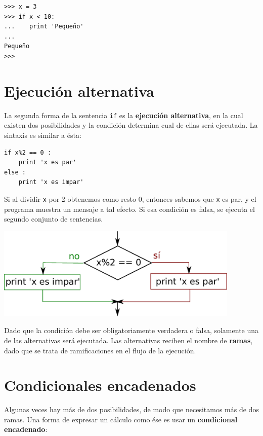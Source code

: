 \beforeverb
\begin{verbatim}
>>> x = 3
>>> if x < 10:
...    print 'Pequeño'
... 
Pequeño
>>>
\end{verbatim}
\afterverb
%

\section{Ejecución alternativa}
\label{alternative execution}


La segunda forma de la sentencia {\tt if} es la {\bf ejecución alternativa},
en la cual existen dos posibilidades y la condición determina
cual de ellas será ejecutada. La sintaxis es similar a ésta:

\beforeverb
\begin{verbatim}
if x%2 == 0 :
    print 'x es par'
else :
    print 'x es impar'
\end{verbatim}
\afterverb
%
Si al dividir {\tt x} por 2 obtenemos como resto 0, entonces sabemos
que {\tt x} es par, y el programa muestra un mensaje a tal
efecto. Si esa condición es falsa, se ejecuta el segundo
conjunto de sentencias.

\beforefig
\centerline{\includegraphics[height=1.75in]{figs2/if-else.eps}}
\afterfig

Dado que la condición debe ser obligatoriamente verdadera o falsa, solamente una de
las alternativas será ejecutada. Las alternativas reciben el nombre de
{\bf ramas}, dado que se trata de ramificaciones en el flujo de la ejecución.


\section{Condicionales encadenados}

Algunas veces hay más de dos posibilidades, de modo que necesitamos más
de dos ramas. Una forma de expresar un cálculo como ése es usar un
{\bf condicional encadenado}:

